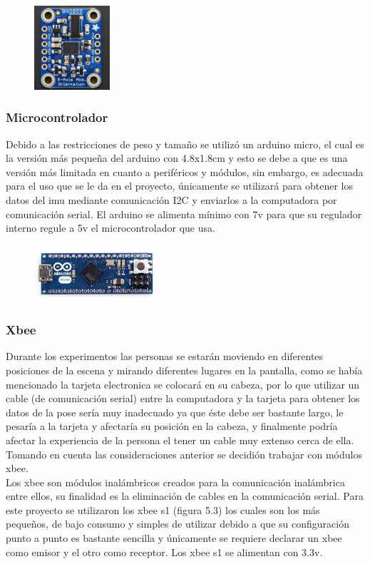      \begin{figure}[htbp]
     	\centering
     	\includegraphics[width=0.25\textwidth]{./pictures/bno055}
     	\caption{}\label{fig: figura}
     \end{figure}
     
     \subsubsection{Microcontrolador}
     Debido a las restricciones de peso y tamaño se utilizó un arduino micro, el cual es la versión más pequeña del arduino con 4.8x1.8cm y esto se debe a que es una versión más limitada en cuanto a periféricos y módulos, sin embargo, es adecuada para el uso que se le da en el proyecto, únicamente se utilizará para obtener los datos del imu mediante comunicación I2C y enviarlos a la computadora por comunicación serial. El arduino se alimenta mínimo con 7v para que su regulador interno regule a 5v el microcontrolador que usa.
     \begin{figure}[htbp]
     	\centering
     	\includegraphics[width=0.4\textwidth]{./pictures/arduino}
     	\caption{}\label{fig: figura}
     \end{figure}
     
     \subsubsection{Xbee}
     Durante los experimentos las personas se estarán moviendo en diferentes posiciones de la escena y mirando diferentes lugares en la pantalla, como se había mencionado la tarjeta electronica se colocará en su cabeza, por lo que utilizar un cable (de comunicación serial) entre la computadora y la tarjeta para obtener los datos de la pose sería muy inadecuado ya que éste debe ser bastante largo, le pesaría a la tarjeta y afectaría su posición en la cabeza, y finalmente podría afectar la experiencia de la persona el tener un cable muy extenso cerca de ella. Tomando en cuenta las consideraciones anterior se decidión trabajar con módulos xbee.\\
     Los xbee son módulos inalámbricos creados para la comunicación inalámbrica entre ellos, su finalidad es la eliminación de cables en la comunicación serial. Para este proyecto se utilizaron los xbee s1 (figura 5.3) los cuales son los más  pequeños, de bajo consumo y simples de utilizar debido a que su configuración punto a punto es bastante sencilla y únicamente se requiere declarar un xbee como emisor y el otro como receptor. Los xbee s1 se alimentan con 3.3v.
     
